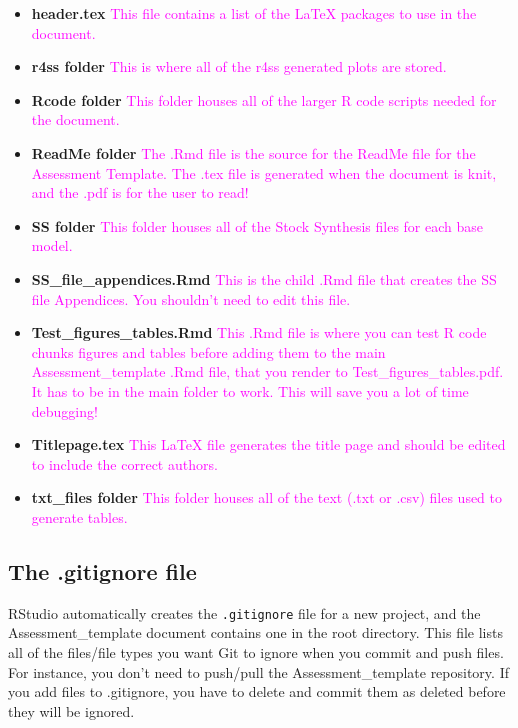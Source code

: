 \documentclass[12pt,]{article}
\begin{document}
\begin{itemize}
\item
  \textbf{header.tex}
  \textcolor{magenta}{This file contains a list of the LaTeX packages to use in the document.}
\item
  \textbf{r4ss folder}
  \textcolor{magenta}{This is where all of the r4ss generated plots are stored.}
\item
  \textbf{Rcode folder}
  \textcolor{magenta}{This folder houses all of the larger R code scripts needed for the document.}
\item
  \textbf{ReadMe folder}
  \textcolor{magenta}{The .Rmd file is the source for the ReadMe file for the Assessment Template.  The .tex file is generated when the document is knit, and the .pdf is for the user to read!}
\item
  \textbf{SS folder}
  \textcolor{magenta}{This folder houses all of the Stock Synthesis files for each base model.}
\item
  \textbf{SS\_file\_appendices.Rmd}
  \textcolor{magenta}{This is the child .Rmd file that creates the SS file Appendices.  You shouldn't need to edit this file.}
\item
  \textbf{Test\_figures\_tables.Rmd}
  \textcolor{magenta}{This .Rmd file is where you can test R code chunks figures and tables before adding them to the main Assessment\_template .Rmd file, that you render to Test\_figures\_tables.pdf.  It has to be in the main folder to work.  This will save you a lot of time debugging!}
\item
  \textbf{Titlepage.tex}
  \textcolor{magenta}{This LaTeX file generates the title page and should be edited to include the correct authors.}
\item
  \textbf{txt\_files folder }
  \textcolor{magenta}{This folder houses all of the text (.txt or .csv) files used to generate tables.}
\end{itemize}

\subsection{The .gitignore file}\label{the-.gitignore-file}

RStudio automatically creates the \texttt{.gitignore} file for a new
project, and the Assessment\_template document contains one in the root
directory. This file lists all of the files/file types you want Git to
ignore when you commit and push files. For instance, you don't need to
push/pull the Assessment\_template repository. If you add files to
.gitignore, you have to delete and commit them as deleted before they
will be ignored.
\end{document}
